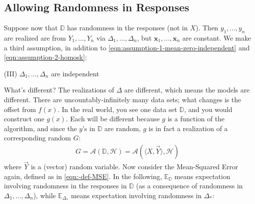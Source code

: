 \documentclass[12pt, a4paper]{article}
\theoremstyle{definition}
\begin{document}
	\subsection*{Allowing Randomness in Responses}
	Suppose now that $\mathbb{D}$ has randomness in the responses (not in $X$).
	Then $y_1,\ldots,y_n$ are realized are from $Y_1,\ldots,Y_n$ via
	$\Delta_1,\ldots,\Delta_n$, but $\bm{x}_1,\ldots,\bm{x}_n$ are constant. We make
	a third assumption, in addition to \ref{eqn:assumption-1-mean-zero-independent} and
	\ref{eqn:assumption-2-homosk}:
	\begin{center}
		(III) $\Delta_1,\ldots,\Delta_n$ are independent
	\end{center}
	What's different? The realizations of $\Delta$ are different, which means the
	models are different. There are uncountably-infinitely many data sets; what changes
	is the offset from $f(x)$. In the real world, you see one data set $\mathbb{D}$,
	and you would construct one $g(x)$. Each will be different because $g$ is
	a function of the algorithm, and since the $y$'s in $\mathbb{D}$ are random, $g$
	is in fact a realization of a corresponding random $G$:
	\begin{align*}
		G
		= \mathcal{A}(\mathbb{D}, \mathcal{H})
		= \mathcal{A}(\langle X, \vec{Y}\rangle, \mathcal{H})
	\end{align*}
	where $\vec{Y}$ is a (vector) random variable.
	Now consider the Mean-Squared Error again, defined as in \ref{eqn:-def-MSE}.
	In the following, $\mathbb{E}_{\mathbb{D}}$ means expectation involving
	randomness in the responses in $\mathbb{D}$ (as a consequence of randomness in
	$\Delta_1,\ldots,\Delta_n$), while $\mathbb{E}_{\Delta_*}$ means expectation
	involving randomness in $\Delta_*$:
\end{document}
